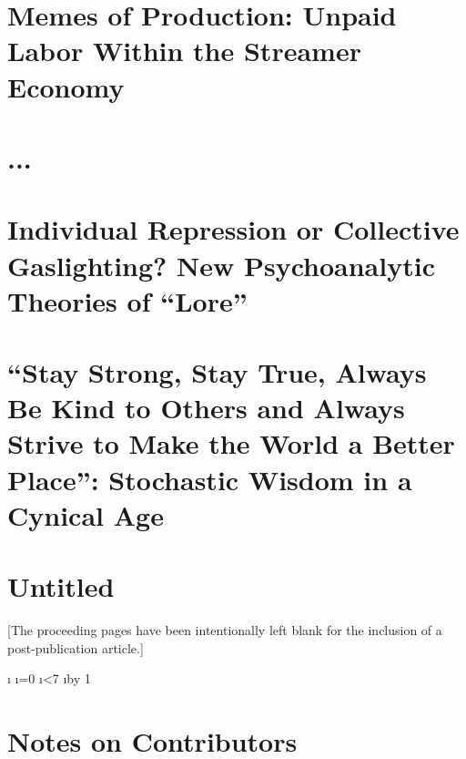 \documentclass[12pt]{book}
\begin{document}
\chapter{Memes of Production: Unpaid Labor Within the Streamer Economy}


\chapter{...}


\chapter{Individual Repression or Collective Gaslighting? New Psychoanalytic Theories of ``Lore''}


\chapter{``Stay Strong, Stay True, Always Be Kind to Others and Always Strive to Make the World a Better Place'': Stochastic Wisdom in a Cynical Age}


\chapter{Untitled}

[The proceeding pages have been intentionally left blank for the inclusion of a post-publication article.]

\newcount\i
\i=0
\loop
    \ifnum\i<7 %
    \null
    \newpage
    \advance\i by 1
\repeat

\backmatter

\chapter*{Notes on Contributors}


\printbibliography[
    title={Works Cited}, %
    heading=bibintoc     %
]
\end{document}
